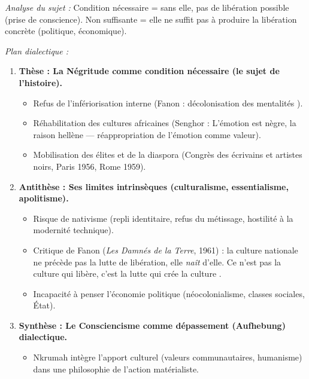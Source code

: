 \documentclass[11pt]{article}
\newcommand{\cle}[1]{{\popxbold\color{popdark}#1}}
\begin{document}
\begin{exoresolu}
\emph{Analyse du sujet :} \guillemotleft Condition nécessaire \guillemotright = sans elle, pas de libération possible (prise de conscience). \guillemotleft Non suffisante \guillemotright = elle ne suffit pas à produire la libération concrète (politique, économique).

\tcblower

\emph{Plan dialectique :}
\begin{enumerate}
    \item \textbf{Thèse : La Négritude comme condition nécessaire (le \guillemotleft sujet \guillemotright de l'histoire).}
    \begin{itemize}
        \item Refus de l'infériorisation interne (Fanon : \guillemotleft décolonisation des mentalités \guillemotright).
        \item Réhabilitation des cultures africaines (Senghor : \guillemotleft L'émotion est nègre, la raison hellène \guillemotright — réappropriation de l'émotion comme valeur).
        \item Mobilisation des élites et de la diaspora (Congrès des écrivains et artistes noirs, Paris 1956, Rome 1959).
    \end{itemize}
    \item \textbf{Antithèse : Ses limites intrinsèques (culturalisme, essentialisme, apolitisme).}
    \begin{itemize}
        \item Risque de \guillemotleft nativisme \guillemotright (repli identitaire, refus du métissage, hostilité à la modernité technique).
        \item Critique de Fanon (\emph{Les Damnés de la Terre}, 1961) : la culture nationale ne précède pas la lutte de libération, elle \emph{naît} d'elle. \guillemotleft Ce n'est pas la culture qui libère, c'est la lutte qui crée la culture \guillemotright.
        \item Incapacité à penser l'économie politique (néocolonialisme, classes sociales, État).
    \end{itemize}
    \item \textbf{Synthèse : Le Consciencisme comme dépassement (Aufhebung) dialectique.}
    \begin{itemize}
        \item Nkrumah intègre l'apport culturel (valeurs communautaires, humanisme) dans une \cle{philosophie de l'action} matérialiste.

\end{itemize}
\end{enumerate}
\end{exoresolu}
\end{document}
